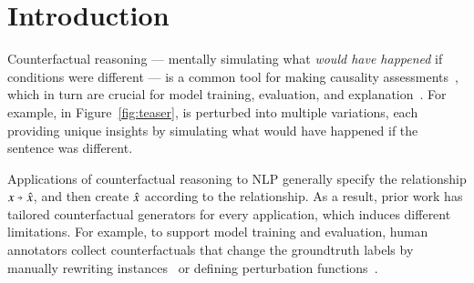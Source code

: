 \section{Introduction}
\label{sec:intro}



Counterfactual reasoning --- mentally simulating what \emph{would have happened} if conditions were different --- is a common tool for making causality assessments~\cite{kahneman}, which in turn are crucial for model training, evaluation, and explanation~\cite{miller}. 
For example, in Figure~\ref{fig:teaser},  is perturbed into multiple variations, each providing unique insights by simulating what would have happened if the sentence was different.


Applications of counterfactual reasoning to NLP generally specify the relationship $x \veryshortarrow \xp$, and then create $\hat{x}$ according to the relationship.
As a result, prior work has tailored counterfactual generators for every application, which induces different limitations.
For example, to support model training and evaluation, human annotators collect counterfactuals that change the groundtruth labels by manually rewriting instances~\cite{gardner2020contrast} or defining perturbation functions~\cite{wu2019errudite}.
